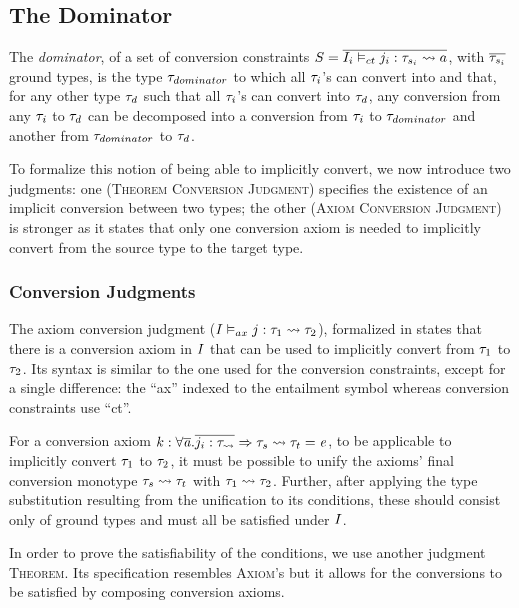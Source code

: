 \subsection{The Dominator}
\label{dominator}
The \textit{dominator}, of a set of conversion constraints $S=\overline{{I_i} \vDash_{ct} {j_i}: {\mathit{\tau}_{s_i}} \rightsquigarrow {a}}$, with $\overline{\mathit{\tau}_{s_i}}$ ground types, is the type $\mathit{\tau}_{dominator}$ to which all $\mathit{\tau}_i$'s can convert into and that, for any other type $\mathit{\tau}_d$ such that  all $\mathit{\tau}_i$'s can convert into $\mathit{\tau}_d$, any conversion from any $\mathit{\tau}_i$ to $\mathit{\tau}_d$ can be decomposed into a conversion from $\mathit{\tau}_i$ to $\mathit{\tau}_{dominator}$ and another from $\mathit{\tau}_{dominator}$ to $\mathit{\tau}_d$.

To formalize this notion of being able to implicitly convert, we now introduce two judgments: one (\textsc{Theorem Conversion Judgment}) specifies the existence of an implicit conversion between two types; the other (\textsc{Axiom Conversion Judgment}) is stronger as it states that only one conversion axiom is needed to implicitly convert from the source type to the target type.


\subsubsection{Conversion Judgments}
\label{susec}
The axiom conversion judgment (${I} \vDash_{ax} {j}: {\mathit{\tau}_1} \rightsquigarrow {\mathit{\tau}_2}$), formalized in  states that there is a conversion axiom in $I$ that can be used to implicitly convert from $\mathit{\tau}_1$ to $\mathit{\tau}_2$. Its syntax is similar to the one used for the conversion constraints, except for a single difference: the ``ax'' indexed to the entailment symbol whereas conversion constraints use ``ct''.

For a conversion axiom $k : \forall \overline{\mathit{a}}.\overline{j_i:\mathit{\tau_{\rightsquigarrow}}} \Rightarrow \mathit{\tau}_s \rightsquigarrow \mathit{\tau}_t=\mathit{e} $, to be applicable to implicitly convert $\mathit{\tau}_1$ to $\mathit{\tau}_2$, it must be possible to unify the axioms' final conversion monotype $\mathit{\tau}_s \rightsquigarrow \mathit{\tau}_t$ with $\mathit{\tau}_1 \rightsquigarrow \mathit{\tau}_2$. Further, after applying the type substitution resulting from the unification to its conditions, these should consist only of ground types and must all be satisfied under $I$.

In order to prove the satisfiability of the conditions, we use another judgment \textsc{Theorem}. Its specification resembles \textsc{Axiom}'s but it allows for the conversions to be satisfied by composing conversion axioms.

